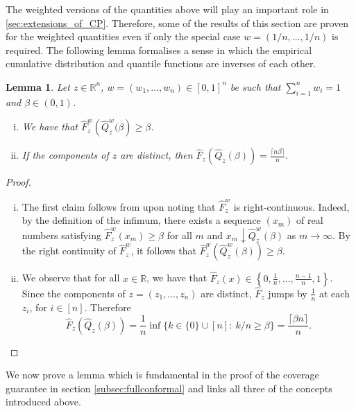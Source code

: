 \documentclass[11pt, titlepage]{article} %
\numberwithin{equation}{section}
\newtheorem{lemma}{Lemma}
\theoremstyle{definition}
\numberwithin{theorem}{section}
\numberwithin{lemma}{section}
\numberwithin{corollary}{section}
\numberwithin{proposition}{section}
\numberwithin{definition}{section}
\numberwithin{remark}{section}
\begin{document}
\noindent
The weighted versions of the quantities above will play an important role in \cref{sec:extensions_of_CP}. Therefore, some of the results of this section are proven for the weighted quantities even if only the special case \(w = (1/n, \ldots, 1/n)\) is required. The following lemma formalises a sense in which the empirical cumulative distribution and quantile functions are inverses of each other.

\begin{lemma} Let \(z \in \mathbb{R}^n\), \(w = (w_1, \ldots, w_n) \in [0,1]^n\) be such that \(\sum_{i=1}^n w_i = 1\) and \(\beta \in (0,1)\).
    \begin{enumerate}[(i)] \itemsep0em
        \item We have that \(\hat{F}^w_z\left(\hat{Q}^w_z(\beta \right) \geq \beta\).
        \item If the components of \(z\) are distinct, then \(\hat{F}_z\left(\hat{Q}_z(\beta)\right) = \frac{\lceil{n\beta}\rceil}{n}.\)
    \end{enumerate} 
\label{lemma:cdfquantile}
\end{lemma}
\begin{proof}

    \begin{enumerate}[(i)] \itemsep0em
        \item The first claim follows from upon noting that \(\hat{F}^w_z\) is right-continuous. Indeed, by the definition of the infimum, there exists a sequence \((x_m)\) of real numbers satisfying \(\hat{F}^w_z(x_m) \geq \beta\) for all \(m\) and \(x_m \downarrow \hat{Q}^w_z(\beta)\) as \(m \to \infty\). By the right continuity of \(\hat{F}^w_z\), it follows that \(\hat{F}^w_z\left(\hat{Q}^w_z(\beta) \right) \geq \beta\).
        \item We observe that for all \(x \in \mathbb{R}\), we have that \(\hat{F}_z(x) \in \left\{0, \frac{1}{n}, \ldots, \frac{n-1}{n}, 1\right\}\). Since the components of \(z = (z_1, \ldots, z_n)\) are distinct, \(\hat{F}_z\) jumps by \(\frac{1}{n}\) at each \(z_i\), for \(i \in [n]\). Therefore \[\hat{F}_z\left(\hat{Q}_z(\beta)\right) = \frac{1}{n} \inf \{k \in \{0\} \cup [n]: \ k/n \geq \beta \} = \frac{\lceil{\beta n}\rceil}{n}.\]
    \end{enumerate}
\end{proof}

\noindent
We now prove a lemma which is fundamental in the proof of the coverage guarantee in section \cref{subsec:fullconformal} and links all three of the concepts introduced above.
\end{document}

